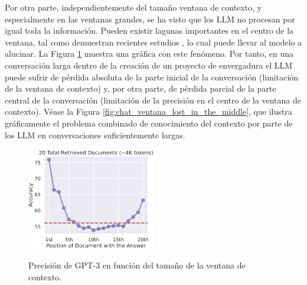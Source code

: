 Por otra parte, independientemente del tamaño ventana de contexto, y especialmente en las ventanas grandes, se ha visto que los LLM no procesan por igual toda la información. Pueden existir lagunas importantes en el centro de la ventana, tal como demuestran recientes estudios \citep{liuLostMiddleHow2023}, lo cual puede llevar al modelo a alucinar. La Figura \ref{fig:Precision_LLM_gran_contexto} muestra una gráfica con este fenómeno. Por tanto, en una conversación larga dentro de la creación de un proyecto de envergadura el LLM puede sufrir de pérdida absoluta de la parte inicial de la conversación (limitación de la ventana de contexto) y, por otra parte, de pérdida parcial de la parte central de la conversación (limitación de la precisión en el centro de la ventana de contexto). Véase la Figura \ref{fig:chat_ventana_lost_in_the_middle}, que ilustra gráficamente el problema combinado de conocimiento del contexto por parte de los LLM en conversaciones suficientemente largas.


\begin{figure}[H]
    \caption[Precisión de GPT-3 en función del tamaño de la ventana de contexto]{Precisión de GPT-3 en función del tamaño de la ventana de contexto.}
    \centering
    \includegraphics[width=0.5\textwidth]{./figuras/Precision_LLM_gran_contexto.png}
    \label{fig:Precision_LLM_gran_contexto}
\end{figure}

